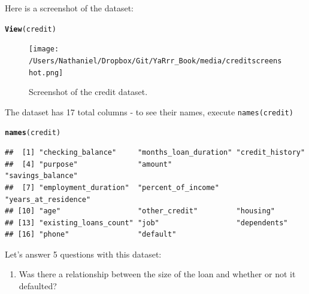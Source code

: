 \documentclass{tufte-book}\usepackage[]{graphicx}\usepackage[]{color}
\makeatletter
\newcommand{\hlstr}[1]{\textcolor[rgb]{0.192,0.494,0.8}{#1}}%
\newcommand{\hlopt}[1]{\textcolor[rgb]{0,0,0}{#1}}%
\newcommand{\hlstd}[1]{\textcolor[rgb]{0.345,0.345,0.345}{#1}}%
\newcommand{\hlkwb}[1]{\textcolor[rgb]{0.69,0.353,0.396}{#1}}%
\newcommand{\hlkwd}[1]{\textcolor[rgb]{0.737,0.353,0.396}{\textbf{#1}}}%
\newenvironment{kframe}{%
 \def\at@end@of@kframe{}%
 \ifinner\ifhmode%
  \def\at@end@of@kframe{\end{minipage}}%
  \begin{minipage}{\columnwidth}%
 \fi\fi%
 \def\FrameCommand##1{\hskip\@totalleftmargin \hskip-\fboxsep
 \colorbox{shadecolor}{##1}\hskip-\fboxsep
     \hskip-\linewidth \hskip-\@totalleftmargin \hskip\columnwidth}%
 \MakeFramed {\advance\hsize-\width
   \@totalleftmargin\z@ \linewidth\hsize
   \@setminipage}}%
 {\par\unskip\endMakeFramed%
 \at@end@of@kframe}
\newenvironment{knitrout}{}{} %
\makeatother
\begin{document}
\begin{footnotesize}
Here is a screenshot of the dataset:

\begin{footnotesize}
\begin{knitrout}
\color{fgcolor}\begin{kframe}
\begin{alltt}
\hlkwd{View}\hlstd{(credit)}
\end{alltt}
\end{kframe}
\end{knitrout}
\end{footnotesize}

\begin{figure}
\texttt{[image: /Users/Nathaniel/Dropbox/Git/YaRrr\_Book/media/creditscreenshot.png]}
\caption{Screenshot of the credit dataset.}
\label{fig:creditscreen}
\end{figure}

The dataset has 17 total columns - to see their names, execute \texttt{names(credit)}

\begin{footnotesize}
\begin{knitrout}
\color{fgcolor}\begin{kframe}
\begin{alltt}
\hlkwd{names}\hlstd{(credit)}
\end{alltt}
\begin{verbatim}
##  [1] "checking_balance"     "months_loan_duration" "credit_history"      
##  [4] "purpose"              "amount"               "savings_balance"     
##  [7] "employment_duration"  "percent_of_income"    "years_at_residence"  
## [10] "age"                  "other_credit"         "housing"             
## [13] "existing_loans_count" "job"                  "dependents"          
## [16] "phone"                "default"
\end{verbatim}
\end{kframe}
\end{knitrout}
\end{footnotesize}

Let's answer 5 questions with this dataset:

\begin{enumerate}

  \item Was there a relationship between the size of the loan and whether or not it defaulted?
  
    
\begin{marginfigure}
\end{marginfigure}
\end{enumerate}
\end{footnotesize}
\end{document}
